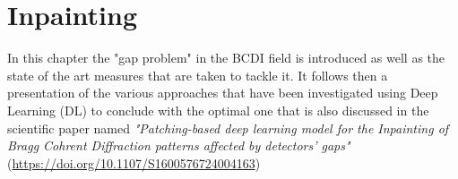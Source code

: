\chapter{Inpainting}\label{chp:inpainting}

In this chapter the "gap problem" in the BCDI field is introduced as well as the state of the art measures that are taken to tackle it. It follows then a presentation of the various approaches that have been investigated using Deep Learning (DL) to conclude with the optimal one that is also discussed in the scientific paper named \textit{"Patching-based deep learning model for the Inpainting of Bragg Cohrent Diffraction patterns affected by detectors' gaps"} (\url{https://doi.org/10.1107/S1600576724004163}) 